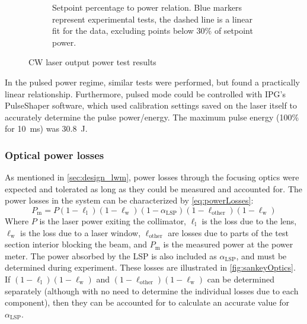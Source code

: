 \begin{figure}[h]
\begin{subfigure}[t]{3.3in}
                    \caption{Setpoint percentage to power relation. Blue markers represent experimental tests, the dashed line is a linear fit for the data, excluding points below 30\% of setpoint power.}
                    \label{fig:cw_tests_setpoint}
                \end{subfigure}
                \caption{CW laser output power test results}
                \label{fig:cw_tests}
            \end{figure}

            In the pulsed power regime, similar tests were performed, but found a practically linear relationship. Furthermore, pulsed mode could be controlled with IPG's PulseShaper software, which used calibration settings saved on the laser itself to accurately determine the pulse power/energy. The maximum pulse energy (100\% for \qty{10}{ms}) was \qty{30.8}{J}.

            \subsubsection*{Optical power losses}
                As mentioned in \autoref{sec:design_lwm}, power losses through the focusing optics were expected and tolerated as long as they could be measured and accounted for. The power losses in the system can be characterized by \autoref{eq:powerLosses}:
                \begin{equation}
                    P_\mathrm{m} = P(1-\ell_\mathrm{l})(1-\ell_\mathrm{w})(1-\alpha_\mathrm{LSP})(1-\ell_\mathrm{other})(1-\ell_\mathrm{w})
                    \label{eq:powerLosses}
                \end{equation}
                Where $P$ is the laser power exiting the collimator, $\ell_\mathrm{l}$ is the loss due to the lens, $\ell_\mathrm{w}$ is the loss due to a laser window, $\ell_\mathrm{other}$ are losses due to parts of the test section interior blocking the beam, and $P_\mathrm{m}$ is the measured power at the power meter. The power absorbed by the LSP is also included as $\alpha_\mathrm{LSP}$, and must be determined during experiment. These losses are illustrated in \autoref{fig:sankeyOptics}. If $(1-\ell_\mathrm{l})(1-\ell_\mathrm{w})$ and $(1-\ell_\mathrm{other})(1-\ell_\mathrm{w})$ can be determined separately (although with no need to determine the individual losses due to each component), then they can be accounted for to calculate an accurate value for $\alpha_\mathrm{LSP}$.

